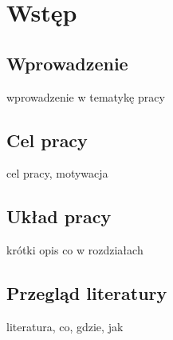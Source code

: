 \chapter{Wstęp}
\section{Wprowadzenie}
wprowadzenie w tematykę pracy
\section{Cel pracy}
cel pracy, motywacja
\section{Układ pracy}
krótki opis co w rozdziałach
\section{Przegląd literatury}
literatura, co, gdzie, jak